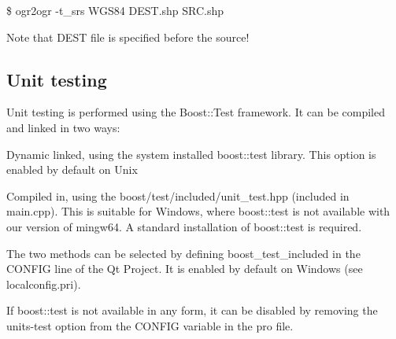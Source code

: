 \$ ogr2ogr -\/t\+\_\+srs W\+G\+S84 D\+E\+S\+T.\+shp S\+R\+C.\+shp

Note that D\+E\+ST file is specified before the source!

\subsection*{Unit testing}

Unit testing is performed using the Boost\+::\+Test framework. It can be compiled and linked in two ways\+:


\begin{DoxyItemize}
\item Dynamic linked, using the system installed boost\+::test library. This option is enabled by default on Unix
\item Compiled in, using the boost/test/included/unit\+\_\+test.\+hpp (included in main.\+cpp). This is suitable for Windows, where boost\+::test is not available with our version of mingw64. A standard installation of boost\+::test is required.
\end{DoxyItemize}

The two methods can be selected by defining boost\+\_\+test\+\_\+included in the C\+O\+N\+F\+IG line of the Qt Project. It is enabled by default on Windows (see localconfig.\+pri).

If boost\+::test is not available in any form, it can be disabled by removing the units-\/test option from the C\+O\+N\+F\+IG variable in the pro file. 